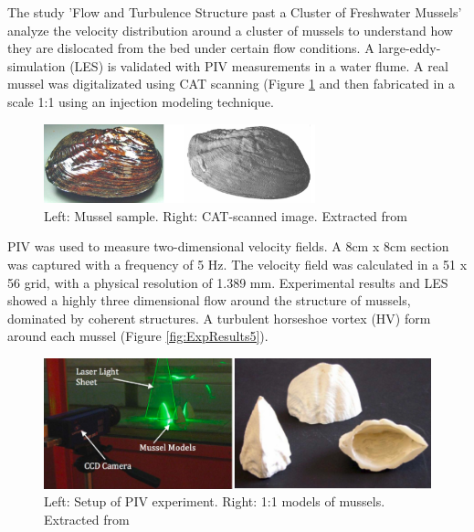 \documentclass[journal]{new-aiaa}
\begin{document}

The study 'Flow and Turbulence Structure past a Cluster of Freshwater Mussels' \cite{Constantinescu2013} analyze the velocity distribution around a cluster of mussels to understand how they are dislocated from the bed under certain flow conditions. A large-eddy-simulation (LES) is validated with PIV measurements in a water flume. A real mussel was digitalizated using CAT scanning (Figure \ref{fig:ExpResults3} and then fabricated in a scale 1:1 using an injection modeling technique.


\begin{figure}[H]
\begin{center}
\includegraphics[width=0.7\textwidth]{Images/federico/Figure13}
\caption{Left: Mussel sample. Right: CAT-scanned image. Extracted from \cite{Constantinescu2013}}
\label{fig:ExpResults3}
\end{center}
\end{figure}

PIV was used to measure two-dimensional velocity fields. A 8cm x 8cm section was captured with a frequency of 5 Hz. The velocity field was calculated in a 51 x 56 grid, with a physical resolution of 1.389 mm. Experimental results and LES showed a highly three dimensional flow around the structure of mussels, dominated by coherent structures. A turbulent horseshoe vortex (HV) form around each mussel (Figure \ref{fig:ExpResults5}). 



\begin{figure}[H]
\begin{center}
\includegraphics[width=1\textwidth]{Images/federico/Figure14}
\caption{Left: Setup of PIV experiment. Right: 1:1 models of mussels. Extracted from \cite{Constantinescu2013}}
\label{fig:ExpResults4}
\end{center}
\end{figure}
\end{document}
